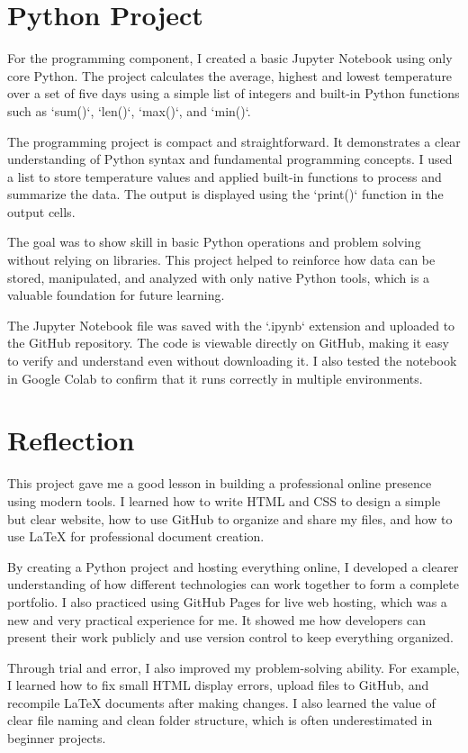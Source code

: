 \documentclass[14pt]{article}
\begin{document}
\section*{Python Project}
For the programming component, I created a basic Jupyter Notebook using only core Python. The project calculates the average, highest and lowest temperature over a set of five days using a simple list of integers and built-in Python functions such as `sum()`, `len()`, `max()`, and `min()`.

The programming project is compact and straightforward. It demonstrates a clear understanding of Python syntax and fundamental programming concepts. I used a list to store temperature values and applied built-in functions to process and summarize the data. The output is displayed using the `print()` function in the output cells.

The goal was to show skill in basic Python operations and problem solving without relying on libraries. This project helped to reinforce how data can be stored, manipulated, and analyzed with only native Python tools, which is a valuable foundation for future learning.

The Jupyter Notebook file was saved with the `.ipynb` extension and uploaded to the GitHub repository. The code is viewable directly on GitHub, making it easy to verify and understand even without downloading it. I also tested the notebook in Google Colab to confirm that it runs correctly in multiple environments.

\section*{Reflection}
This project gave me a good lesson in building a professional online presence using modern tools. I learned how to write HTML and CSS to design a simple but clear website, how to use GitHub to organize and share my files, and how to use LaTeX for professional document creation.

By creating a Python project and hosting everything online, I developed a clearer understanding of how different technologies can work together to form a complete portfolio. I also practiced using GitHub Pages for live web hosting, which was a new and very practical experience for me. It showed me how developers can present their work publicly and use version control to keep everything organized.

Through trial and error, I also improved my problem-solving ability. For example, I learned how to fix small HTML display errors, upload files to GitHub, and recompile LaTeX documents after making changes. I also learned the value of clear file naming and clean folder structure, which is often underestimated in beginner projects.
\end{document}
